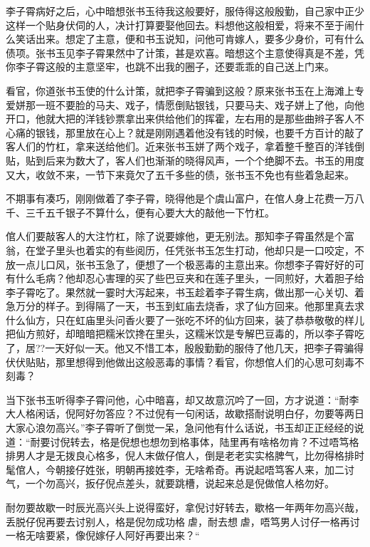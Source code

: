 \documentclass[12pt,UTF8]{ctexbook}
\begin{document}
{{{李子霄病好之后，心中暗想张书玉待我这般要好，服侍得这般殷勤，自己家中正少这样一个贴身伏伺的人，决计打算要娶他回去。料想他这般相爱，将来不至于闹什么笑话出来。想定了主意，便和书玉说知，问他可肯嫁人，要多少身价，可有什么债项。张书玉见李子霄果然中了计策，甚是欢喜。暗想这个主意使得真是不差，凭你李子霄这般的主意坚牢，也跳不出我的圈子，还要乖乖的自己送上门来。

看官，你道张书玉使的什么计策，就把李子霄骗到这般？原来张书玉在上海滩上专爱姘那一班不要脸的马夫、戏子，情愿倒贴银钱，只要马夫、戏子姘上了他，向他开口，他就大把的洋钱钞票拿出来供给他们的挥霍，左右用的是那些曲辫子客人不心痛的银钱，那里放在心上？就是刚刚遇着他没有钱的时候，也要千方百计的敲了客人们的竹杠，拿来送给他们。近来张书玉姘了两个戏子，拿着整千整百的洋钱倒贴，贴到后来为数大了，客人们也渐渐的晓得风声，一个个绝脚不去。书玉的用度又大，收敛不来，一节下来竟欠了五千多些的债，张书玉不免也有些着急起来。

不期事有凑巧，刚刚做着了李子霄，晓得他是个虞山富户，在倌人身上花费一万八千、三千五千银子不算什么，便有心要大大的敲他一下竹杠。

倌人们要敲客人的大注竹杠，除了说要嫁他，更无别法。那知李子霄虽然是个富翁，在堂子里头也着实的有些阅历，任凭张书玉怎生打动，他却只是一口咬定，不放一点儿口风，张书玉急了，便想了一个极恶毒的主意出来。你想李子霄好好的可有什么毛病？他却忍心害理的买了些巴豆夹和在莲子里头，一同煎好，大着胆子给李子霄吃了。果然就一霎时大泻起来，书玉趁着李子霄生病，做出那一心关切、着急万分的样子。到得隔了一天，书玉到虹庙去烧香，求了仙方回来。他那里真去求什么仙方，只在虹庙里头问香火要了一张吃不坏的仙方回来，装了恭恭敬敬的样儿把仙方煎好，却暗暗把糯米饮搀在里头，这糯米饮是专解巴豆毒的，所以李子霄吃了，居??一天好似一天。他又不惜工本，殷殷勤勤的服侍了他几天，把李子霄骗得伏伏贴贴，那里想得到他做出这般恶毒的事情？看官，你想倌人们的心思可刻毒不刻毒？

当下张书玉听得李子霄问他，心中暗喜，却又故意沉吟了一回，方才说道：“耐李大人格闲话，倪阿好勿答应？不过倪有一句闲话，故歇搭耐说明白仔，勿要等两日大家心浪勿高兴。”李子霄听了倒觉一呆，急问他有什么话说，书玉却正正经经的说道：“耐要讨倪转去，格是倪想也想勿到格事体，陆里再有啥格勿肯？不过唔笃格排男人才是无拨良心格多，倪人末做仔倌人，倒是老老实实格脾气，比勿得格排时髦倌人，今朝接仔姓张，明朝再接姓李，无啥希奇。再说起唔笃客人来，加二讨气，一个勿高兴，扳仔倪点差头，就要跳槽，说起来总是倪做倌人格勿好。

耐勿要故歇一时辰光高兴头上说得蛮好，拿倪讨好转去，歇格一年两年勿高兴哉，丢脱仔倪再要去讨别人，格是倪勿成功格虐，耐去想虐，唔笃男人讨仔一格再讨一格无啥要紧，像倪嫁仔人阿好再要出来？“

}}}
\end{document}
